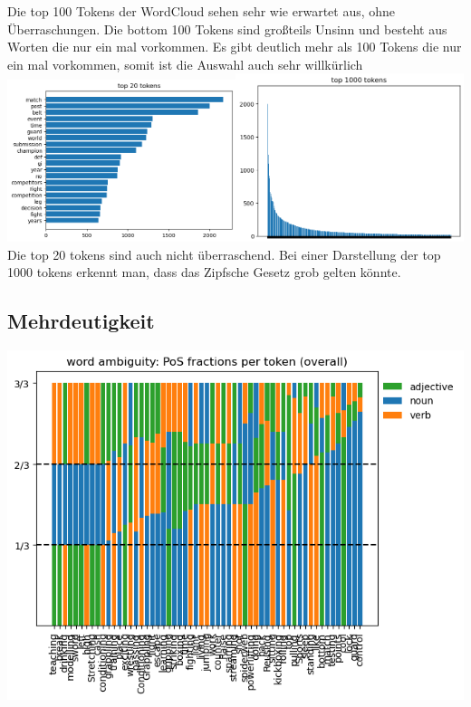 \noindent Die top 100 Tokens der WordCloud sehen sehr wie erwartet aus, ohne Überraschungen. Die bottom 100 Tokens sind gro{\ss}teils Unsinn und besteht aus Worten die nur ein mal vorkommen. Es gibt deutlich mehr als 100 Tokens die nur ein mal vorkommen, somit ist die Auswahl auch sehr willkürlich \\

\includegraphics[width=0.5\textwidth]{images/top_20_tokens.png}\includegraphics[width=0.5\textwidth]{images/top_1000_tokens.png} \\

\noindent Die top 20 tokens sind auch nicht überraschend. Bei einer Darstellung der top 1000 tokens erkennt man, dass das Zipfsche Gesetz grob gelten könnte.

\subsection{Mehrdeutigkeit}

\includegraphics[width=\textwidth]{images/word_ambiguity.png} \\

